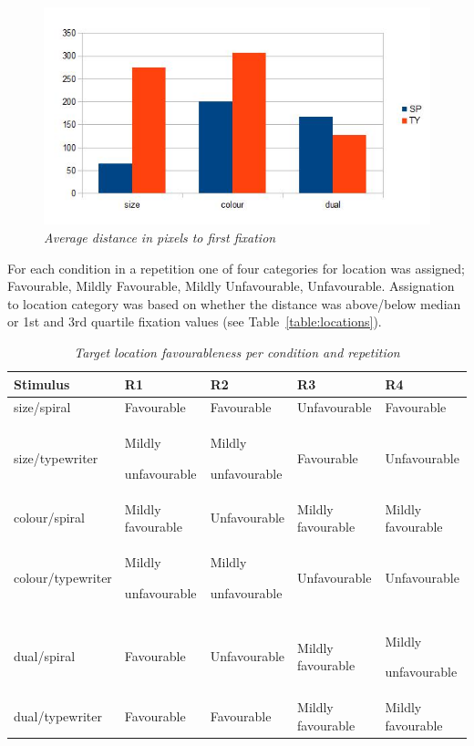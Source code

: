 \begin{figure}[!htb]
	\centering
	\includegraphics[scale=0.40]{fixations.jpg}
 	\caption{\textit{Average distance in pixels to first fixation}}
	\label{fig:fixations}
\end{figure}

For each condition in a repetition one of four categories for location was assigned; Favourable, Mildly Favourable, Mildly Unfavourable, Unfavourable. Assignation to location category was based on whether the distance was above/below median or 1st and 3rd quartile fixation values (see Table~\vref{table:locations}).

\begin{table}
\centering
\caption{\textit{Target location favourableness per condition and repetition}}
\begin{tabular}{|p{3cm}|p{2.5cm}|p{2.5cm}|p{2.5cm}|p{2.5cm}|} \hline
\textbf{Stimulus}&\textbf{R1}&\textbf{R2}&\textbf{R3}&\textbf{R4}\\ \hline
size/spiral&Favourable&Favourable&Unfavourable&Favourable\\ \hline
size/typewriter&Mildly\par unfavourable&Mildly\par  unfavourable&Favourable&Unfavourable\\ \hline
colour/spiral&Mildly favourable&Unfavourable&Mildly favourable&Mildly favourable\\ \hline
colour/typewriter&Mildly\par  unfavourable&Mildly\par  unfavourable&Unfavourable&Unfavourable\\ \hline
dual/spiral&Favourable&Unfavourable&Mildly favourable&Mildly\par  unfavourable\\ \hline
dual/typewriter&Favourable&Favourable&Mildly favourable&Mildly favourable\\ \hline
\end{tabular}
\label{table:locations}
\end{table}

